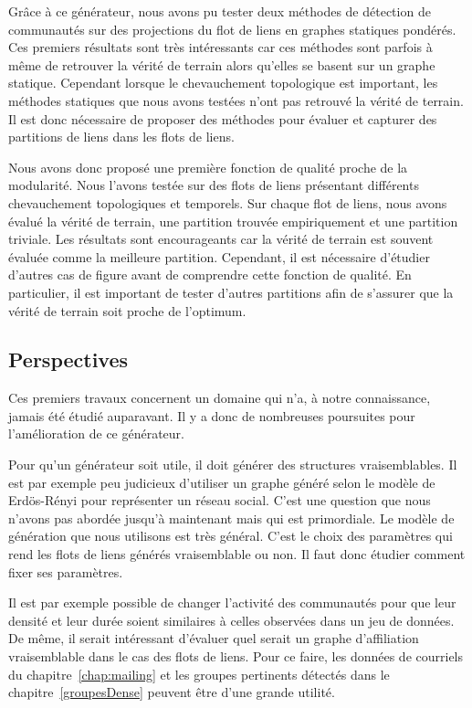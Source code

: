 Grâce à ce générateur, nous avons pu tester deux méthodes de détection de communautés sur des projections du flot de liens en graphes statiques pondérés.
Ces premiers résultats sont très intéressants car ces méthodes sont parfois à même de retrouver la vérité de terrain alors qu'elles se basent sur un graphe statique.
Cependant lorsque le chevauchement topologique est important, les méthodes statiques que nous avons testées n'ont pas retrouvé la vérité de terrain.
Il est donc nécessaire de proposer des méthodes pour évaluer et capturer des partitions de liens dans les flots de liens.

Nous avons donc proposé une première fonction de qualité proche de la modularité.
Nous l'avons testée sur des flots de liens présentant différents chevauchement topologiques et temporels.
Sur chaque flot de liens, nous avons évalué la vérité de terrain, une partition trouvée empiriquement et une partition triviale.
Les résultats sont encourageants car la vérité de terrain est souvent évaluée comme la meilleure partition.
Cependant, il est nécessaire d'étudier d'autres cas de figure avant de comprendre cette fonction de qualité.
En particulier, il est important de tester d'autres partitions afin de s'assurer que la vérité de terrain soit proche de l'optimum.


\subsection{Perspectives}
Ces premiers travaux concernent un domaine qui n'a, à notre connaissance, jamais été étudié auparavant.
Il y a donc de nombreuses poursuites pour l'amélioration de ce générateur.


Pour qu'un générateur soit utile, il doit générer des structures vraisemblables.
Il est par exemple peu judicieux d'utiliser un graphe généré selon le modèle de Erdös-Rényi pour représenter un réseau social.
C'est une question que nous n'avons pas abordée jusqu'à maintenant mais qui est primordiale.
Le modèle de génération que nous utilisons est très général.
C'est le choix des paramètres qui rend les flots de liens générés vraisemblable ou non.
Il faut donc étudier comment fixer ses paramètres.

Il est par exemple possible de changer l'activité des communautés pour que leur densité et leur durée soient similaires à celles observées dans un jeu de données.
De même, il serait intéressant d'évaluer quel serait un graphe d'affiliation vraisemblable dans le cas des flots de liens.
Pour ce faire, les données de courriels du chapitre~\ref{chap:mailing} et les groupes pertinents détectés dans le chapitre~\ref{groupesDense} peuvent être d'une grande utilité.

